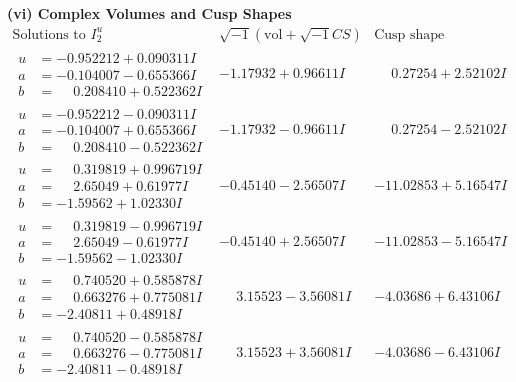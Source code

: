 \documentclass[1p]{elsarticle_modified}
\theoremstyle{definition}
\newcommand{\I}{\sqrt{-1}}
\begin{document}
\newpage\flushleft \textbf{(vi) Complex Volumes and Cusp Shapes}
$$\begin{array}{c|c|c}  
\text{Solutions to }I^u_{2}& \I (\text{vol} + \sqrt{-1}CS) & \text{Cusp shape}\\
 \hline 
\begin{aligned}
u &= -0.952212 + 0.090311 I \\
a &= -0.104007 - 0.655366 I \\
b &= \phantom{-}0.208410 + 0.522362 I\end{aligned}
 & -1.17932 + 0.96611 I & \phantom{-}0.27254 + 2.52102 I \\ \hline\begin{aligned}
u &= -0.952212 - 0.090311 I \\
a &= -0.104007 + 0.655366 I \\
b &= \phantom{-}0.208410 - 0.522362 I\end{aligned}
 & -1.17932 - 0.96611 I & \phantom{-}0.27254 - 2.52102 I \\ \hline\begin{aligned}
u &= \phantom{-}0.319819 + 0.996719 I \\
a &= \phantom{-}2.65049 + 0.61977 I \\
b &= -1.59562 + 1.02330 I\end{aligned}
 & -0.45140 - 2.56507 I & -11.02853 + 5.16547 I \\ \hline\begin{aligned}
u &= \phantom{-}0.319819 - 0.996719 I \\
a &= \phantom{-}2.65049 - 0.61977 I \\
b &= -1.59562 - 1.02330 I\end{aligned}
 & -0.45140 + 2.56507 I & -11.02853 - 5.16547 I \\ \hline\begin{aligned}
u &= \phantom{-}0.740520 + 0.585878 I \\
a &= \phantom{-}0.663276 + 0.775081 I \\
b &= -2.40811 + 0.48918 I\end{aligned}
 & \phantom{-}3.15523 - 3.56081 I & -4.03686 + 6.43106 I \\ \hline\begin{aligned}
u &= \phantom{-}0.740520 - 0.585878 I \\
a &= \phantom{-}0.663276 - 0.775081 I \\
b &= -2.40811 - 0.48918 I\end{aligned}
 & \phantom{-}3.15523 + 3.56081 I & -4.03686 - 6.43106 I \\ \hline\begin{aligned}

\end{aligned}
\end{array}$$
\end{document}
